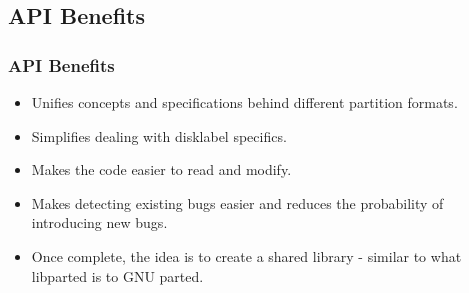\subsection{API Benefits}
\begin{frame}\frametitle{API Benefits}
  \begin{itemize}
  \item Unifies concepts and specifications behind different partition formats.
  \item Simplifies dealing with disklabel specifics.
  \item Makes the code easier to read and modify.
  \item Makes detecting existing bugs easier and reduces the probability of introducing new bugs.
  \item Once complete, the idea is to create a shared library - similar to what libparted is to GNU parted.
  \end{itemize}
\end{frame}
